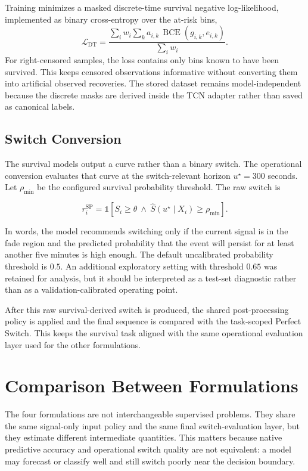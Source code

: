 Training minimizes a masked discrete-time survival negative log-likelihood,
implemented as binary cross-entropy over the at-risk bins,
\[
  \mathcal{L}_{\mathrm{DT}}
  =
  \frac{
    \sum_i w_i
    \sum_k a_{i,k}\,
    \operatorname{BCE}(g_{i,k},e_{i,k})
  }{
    \sum_i w_i
  } .
\]
For right-censored samples, the loss contains only bins known to have been
survived. This keeps censored observations informative without converting them
into artificial observed recoveries. The stored dataset remains
model-independent because the discrete masks are derived inside the TCN adapter
rather than saved as canonical labels.

\subsection{Switch Conversion}
The survival models output a curve rather than a binary switch. The operational
conversion evaluates that curve at the switch-relevant horizon
\(u^\star=300\) seconds. Let \(\rho_{\min}\) be the configured survival
probability threshold. The raw switch is

\[
  r_i^{\text{SP}}
  =
  \mathbb{1}
  \left[
    S_i \ge \theta
    \ \land\
    \widehat{S}(u^\star \mid X_i) \ge \rho_{\min}
  \right].
\]

In words, the model recommends switching only if the current signal is in the
fade region and the predicted probability that the event will persist for at
least another five minutes is high enough. The default uncalibrated probability
threshold is \(0.5\). An additional exploratory setting with threshold \(0.65\)
was retained for analysis, but it should be interpreted as a test-set
diagnostic rather than as a validation-calibrated operating point.

After this raw survival-derived switch is produced, the shared post-processing
policy is applied and the final sequence is compared with the task-scoped
Perfect Switch. This keeps the survival task aligned with the same operational
evaluation layer used for the other formulations.

\section{Comparison Between Formulations}
The four formulations are not interchangeable supervised problems. They share
the same signal-only input policy and the same final switch-evaluation layer,
but they estimate different intermediate quantities. This matters because native
predictive accuracy and operational switch quality are not equivalent: a model
may forecast or classify well and still switch poorly near the decision
boundary.

